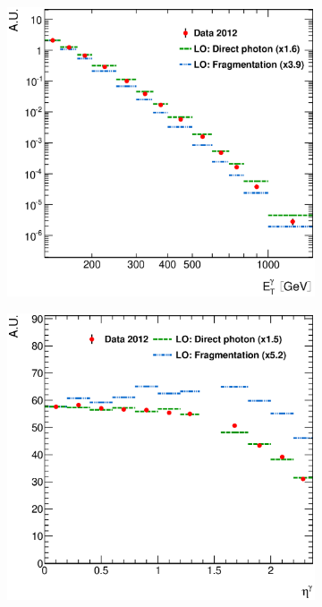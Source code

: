 \documentclass[12pt, twoside]{article}
\numberwithin{equation}{section}
\numberwithin{figure}{section}
\newenvironment{changemargin}[2]{%
\begin{list}{}{%
\setlength{\topsep}{0pt}%
\setlength{\leftmargin}{#1}%
\setlength{\rightmargin}{#2}%
\setlength{\listparindent}{\parindent}%
\setlength{\itemindent}{\parindent}%
\setlength{\parsep}{\parskip}%
}%
\item[]}{\end{list}}
\begin{document}
\begin{figure}
    \centering
    \checkoddpage
    \ifoddpage
        \begin{changemargin}{-1.0cm}{-0.75cm}
    \else
        \begin{changemargin}{-0.75cm}{-1.0cm}
    \fi
        \begin{subfigure}[b]{0.37\textwidth}
            \includegraphics[width=\textwidth]{./images/DifferentialCrossSectionsDPFP/NORM_DIFF_CRSS_SEC-101.eps}
            \subcaption{}
            \label{fig:DiffCrossSectDPFPEtPhoton}
        \end{subfigure}
        \begin{subfigure}[b]{0.37\textwidth}
            \includegraphics[width=\textwidth]{./images/DifferentialCrossSectionsDPFP/NORM_DIFF_CRSS_SEC-102.eps}

\end{subfigure}
\end{changemargin}
\end{changemargin}
\end{figure}
\end{document}
